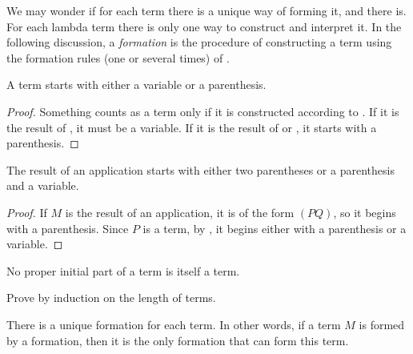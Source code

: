\documentclass[../../../include/open-logic-section]{subfiles}
\begin{document}

We may wonder if for each term there is a unique way of forming it,
and there is.  For each lambda term there is only one way to construct
and interpret it.  In the following discussion, a \emph{formation} is
the procedure of constructing a term using the formation rules (one or
several times) of .

\begin{lem}
A term starts with either a variable or a parenthesis.
\end{lem}

\begin{proof}
Something counts as a term only if it is constructed according to
. If it is the result of
, it must be a variable. If it is the result
of  or , it starts
with a parenthesis.
\end{proof}

\begin{lem}
The result of an application starts with either two parentheses or a
parenthesis and a variable.
\end{lem}

\begin{proof}
If $M$ is the result of an application, it is of the form $(PQ)$, so
it begins with a parenthesis. Since $P$ is a term, by
, it begins either with a parenthesis or a
variable.
\end{proof}

\begin{lem}
No proper initial part of a term is itself a term.
\end{lem}

\begin{prob}
Prove  by induction on the length
of terms.
\end{prob}

\begin{prop} 
There is a unique formation for each term. In other words, if a term
$M$ is formed by a formation, then it is the only formation that can
form this term.
\end{prop}
\end{document}
